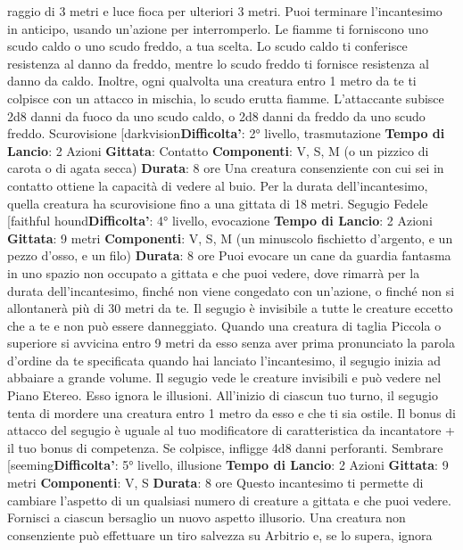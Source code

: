 \begin{multicols}{2}
raggio di 3 metri e luce fioca per ulteriori 3 metri. Puoi
terminare l’incantesimo in anticipo, usando un’azione
per interromperlo.
Le fiamme ti forniscono uno scudo caldo o uno scudo
freddo, a tua scelta. Lo scudo caldo ti conferisce
resistenza al danno da freddo, mentre lo scudo freddo ti
fornisce resistenza al danno da caldo.
Inoltre, ogni qualvolta una creatura entro 1 metro da te
ti colpisce con un attacco in mischia, lo scudo erutta
fiamme. L’attaccante subisce 2d8 danni da fuoco da
uno scudo caldo, o 2d8 danni da freddo da uno scudo
freddo.
Scurovisione
[darkvision\textbf{Difficolta'}:
2° livello, trasmutazione
\textbf{Tempo di Lancio}: 2 Azioni
\textbf{Gittata}: Contatto
\textbf{Componenti}: V, S, M (o un pizzico di carota o di agata
secca)
\textbf{Durata}: 8 ore
Una creatura consenziente con cui sei in contatto
ottiene la capacità di vedere al buio. Per la durata
dell’incantesimo, quella creatura ha scurovisione fino a
una gittata di 18 metri.
Segugio Fedele
[faithful hound\textbf{Difficolta'}:
4° livello, evocazione
\textbf{Tempo di Lancio}: 2 Azioni
\textbf{Gittata}: 9 metri
\textbf{Componenti}: V, S, M (un minuscolo fischietto
d’argento, e un pezzo d’osso, e un filo)
\textbf{Durata}: 8 ore
Puoi evocare un cane da guardia fantasma in uno
spazio non occupato a gittata e che puoi vedere, dove
rimarrà per la durata dell’incantesimo, finché non viene
congedato con un’azione, o finché non si allontanerà
più di 30 metri da te.
Il segugio è invisibile a tutte le creature eccetto che a te
e non può essere danneggiato. Quando una creatura di
taglia Piccola o superiore si avvicina entro 9 metri da
esso senza aver prima pronunciato la parola d’ordine
da te specificata quando hai lanciato l’incantesimo, il
segugio inizia ad abbaiare a grande volume. Il segugio
vede le creature invisibili e può vedere nel Piano
Etereo. Esso ignora le illusioni.
All’inizio di ciascun tuo turno, il segugio tenta di
mordere una creatura entro 1 metro da esso e che ti
sia ostile. Il bonus di attacco del segugio è uguale al tuo
modificatore di caratteristica da incantatore + il tuo
bonus di competenza. Se colpisce, infligge 4d8 danni
perforanti.
Sembrare
[seeming\textbf{Difficolta'}:
5° livello, illusione
\textbf{Tempo di Lancio}: 2 Azioni
\textbf{Gittata}: 9 metri
\textbf{Componenti}: V, S
\textbf{Durata}: 8 ore
Questo incantesimo ti permette di cambiare l’aspetto di
un qualsiasi numero di creature a gittata e che puoi
vedere. Fornisci a ciascun bersaglio un nuovo aspetto
illusorio. Una creatura non consenziente può effettuare
un tiro salvezza su Arbitrio e, se lo supera, ignora

\end{multicols}
